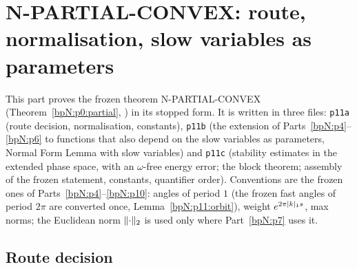 \section{N-PARTIAL-CONVEX: route, normalisation, slow variables as parameters}\label{bpN:p11}
\providecommand{\wn}[3]{\lvert #1\rvert_{#2,#3}}
\providecommand{\Dom}[2]{\mathcal D_{#1,#2}}
\providecommand{\Os}[2]{\mathcal O(#1,#2)}
\providecommand{\UD}[1]{U_{#1}D}
\providecommand{\ip}[2]{\langle #1,#2\rangle}
\providecommand{\Pj}{\Pi}
\providecommand{\Eb}{\mathcal E}
\providecommand{\ba}{\bar\alpha}
\begingroup\sloppy

This part proves the frozen theorem N-PARTIAL-CONVEX (Theorem~\ref{bpN:p0:partial}, ) in its stopped form. It is written in three files: \texttt{p11a} (route decision, normalisation, constants), \texttt{p11b} (the extension of Parts~\ref{bpN:p4}--\ref{bpN:p6} to functions that also depend on the slow variables as parameters, Normal Form Lemma with slow variables) and \texttt{p11c} (stability estimates in the extended phase space, with an $\omega$-free energy error; the block theorem; assembly of the frozen statement, constants, quantifier order). Conventions are the frozen ones of Parts~\ref{bpN:p4}--\ref{bpN:p10}: angles of period $1$ (the frozen fast angles of period $2\pi$ are converted once, Lemma~\ref{bpN:p11:orbit}), weight $e^{2\pi\lvert k\rvert_1s}$, max norms; the Euclidean norm $\lVert \cdot\rVert_2$ is used only where Part~\ref{bpN:p7} uses it.

\subsection{Route decision}\label{bpN:p11:s-route}

